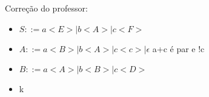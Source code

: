 \documentclass[]{article}
\begin{document}
		Correção do professor:
		
		\begin{itemize}
			\item $S::= a<E> | b<A> | c<F>$
			\item $A::= a<B> | b<A> |c<c>| \epsilon$ a+c é par e !c
			\item $B::= a<A> |b<B> |c<D>$
			\item




				





k

		\end{itemize}
\end{document}
